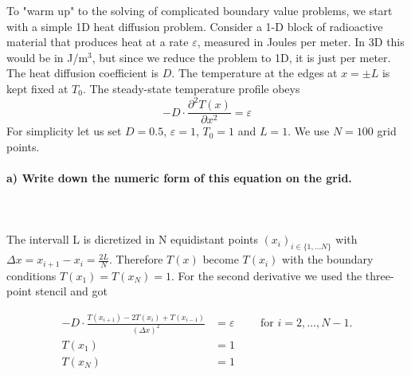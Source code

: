 To "warm up" to the solving of complicated boundary value problems, we 
start with a simple 1D heat diffusion problem. Consider a 1-D block of 
radioactive material that produces heat at a rate $\varepsilon$, 
measured in Joules per meter. In 3D this would be in J/m$^3$, but 
since we reduce the problem to 1D, it is just per meter. The heat 
diffusion coefficient is $D$. The temperature at the edges at $x=\pm L$ 
is kept fixed at $T_0$. The steady-state temperature profile obeys
\begin{equation}
    -D\cdot\frac{\partial^2T(x)}{\partial x^2}=\varepsilon
    \label{eq:temp_diffusion_equation}
\end{equation}
For simplicity let us set $D=0.5$, $\varepsilon=1$, $T_0=1$ and $L=1$. 
We use $N=100$ grid points.

\paragraph{
    a) Write down the numeric form of this equation on the grid.
} \ \\
    \\
    The intervall L is dicretized in N equidistant points $(x_i)_{i \in \{1, \dots N\}}$ with $\Delta x = x_{i+1}-x_i = \frac{2L}{N}$. Therefore $T(x)$ become $T(x_i)$ with the boundary conditions $T(x_1)=T(x_N)=1$. For the second derivative we used the three-point stencil and got
  \begin{comment}  If the temperature difference between two grid cells is expressed as 
    $\Delta T$, and the two grid cells have a distance of 
    $\Delta x=L/N$, then equation 
    \ref{eq:temp_diffusion_equation} can be rewritten into discrete 
    form as
\end{comment}

    \begin{align}
        -D\cdot\frac{T(x_{i+1}) - 2 T(x_i) + T(x_{i-1})}{(\Delta x)^2}&=\varepsilon \qquad \text{ for } i = 2, \dots, N-1.\\
        T(x_1) &= 1 \\
        T(x_N) &= 1
    \end{align}
